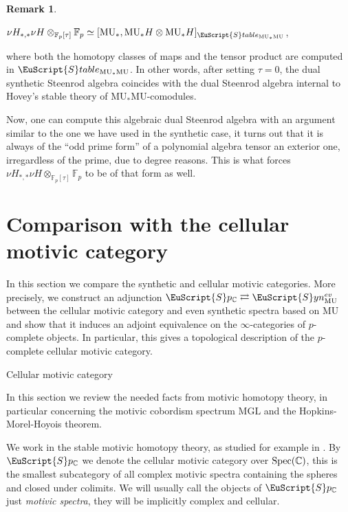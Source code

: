 \documentclass[oneside,a4paper]{amsart}
\makeatletter
\newcommand{\euscr}[1]{\EuScript{#1}} %
\newcommand{\MU}{\mathrm{MU}} %
\newcommand{\MGL}{\mathrm{MGL}} %
\newcommand{\cspectra}{\euscr{S}p_{\mathbb{C}}} %
\newcommand{\synspectra}{\euscr{S}yn} %
\newcommand{\fieldp}{\mathbb{F}_{p}} %
\theoremstyle{plain}
\theoremstyle{definition}
\newtheorem{rem}[thm]{Remark}
\theoremstyle{remark}
\def\subsection{\@startsection{subsection}{1}%
  \z@{.7\linespacing\@plus\linespacing}{.5\linespacing}%
  {\normalfont\bfseries\centering}}%
\makeatother
\begin{document}
\begin{rem}
\begin{center}
$\nu H_{*, *} \nu H \otimes _{\fieldp[\tau]} \fieldp \simeq [\MU_{*}, \MU_{*}H \otimes \MU_{*}H]_{\euscr{S}table_{\MU_{*}\MU}}$,
\end{center}
where both the homotopy classes of maps and the tensor product are computed in $\euscr{S}table_{\MU_{*}\MU}$. In other words, after setting $\tau = 0$, the dual synthetic Steenrod algebra coincides with the dual Steenrod algebra internal to Hovey's stable theory of $\MU_{*}\MU$-comodules. 

Now, one can compute this algebraic dual Steenrod algebra with an argument similar to the one we have used in the synthetic case, it turns out that it is always of the ``odd prime form'' of a polynomial algebra tensor an exterior one, irregardless of the prime, due to degree reasons. This is what forces $\nu H_{*, *} \nu H \otimes _{\fieldp[\tau]} \fieldp$ to be of that form as well.
\end{rem}

\section{Comparison with the cellular motivic category}
\label{section_comparison_with_the_cellular_motivic_category}

In this section we compare the synthetic and cellular motivic categories. More precisely, we construct an adjunction $\cspectra \rightleftarrows \synspectra_{\MU}^{ev}$ between the cellular motivic category and even synthetic spectra based on $\MU$ and show that it induces an adjoint equivalence on the $\infty$-categories of $p$-complete objects. In particular, this gives a topological description of the $p$-complete cellular motivic category. 

\subsection{Cellular motivic category} 

In this section we review the needed facts from motivic homotopy theory, in particular concerning the motivic cobordism spectrum $\MGL$ and the Hopkins-Morel-Hoyois theorem. 

We work in the stable motivic homotopy theory, as studied for example in \cite{morel19991}. By $\cspectra$ we denote the cellular motivic category over $\textnormal{Spec}(\mathbb{C})$, this is the smallest subcategory of all complex motivic spectra containing the spheres and closed under colimits. We will usually call the objects of $\cspectra$ just \emph{motivic spectra}, they will be implicitly complex and cellular. 
\end{document}
